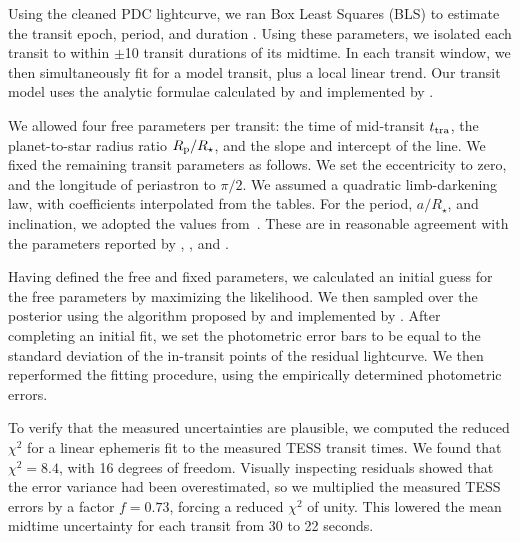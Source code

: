 \documentclass[12pt,twocolumn,tighten]{aastex62}
\begin{document}
Using the cleaned PDC lightcurve, we ran Box Least Squares (BLS) to
estimate the transit epoch, period, and duration
\citep{kovacs_box-fitting_2002}.  Using these parameters, we isolated
each transit to within $\pm$10 transit durations of its midtime.  In
each transit window, we then simultaneously fit for a model transit,
plus a local linear trend.  Our transit model uses the analytic
formulae calculated by \citet{mandel_analytic_2002} and implemented by
\citet{kreidberg_batman_2015}.

We allowed four free parameters per transit: the time of mid-transit
$t_{\rm tra}$, the planet-to-star radius ratio $R_{\rm p}/R_\star$,
and the slope and intercept of the line.
We fixed the remaining transit parameters as follows.  We set the
eccentricity to zero, and the longitude of periastron to $\pi/2$.  We
assumed a quadratic limb-darkening law, with coefficients interpolated
from the \citet{claret_limb_2017} tables.  For the period,
$a/R_\star$, and inclination, we adopted the values
from~\citet{petrucci_no_2013}.  These are in reasonable agreement with
the parameters reported by \citet{gillon_improved_2009},
\citet{southworth_high-precision_2009}, and
\citet{huitson_gemini_2017}.

Having defined the free and fixed parameters, we calculated an initial
guess for the free parameters by maximizing the likelihood.  We then
sampled over the posterior using the algorithm proposed by
\citet{goodman_ensemble_2010} and implemented by
\citet{foreman-mackey_emcee_2013}.
After completing an initial fit, we set the photometric error bars to
be equal to the standard deviation of the in-transit points of the
residual lightcurve.  We then reperformed the fitting procedure, using
the empirically determined photometric errors.

To verify that the measured uncertainties are plausible, we computed
the reduced $\chi^2$ for a linear ephemeris fit to the measured TESS
transit times.  We found that $\chi^2 = 8.4$, with 16 degrees of
freedom.  Visually inspecting residuals showed that the error variance
had been overestimated, so we multiplied the measured TESS errors by a
factor $f=0.73$, forcing a reduced $\chi^2$ of unity.  This lowered
the mean midtime uncertainty for each transit from 30 to 22 seconds.
\end{document}
